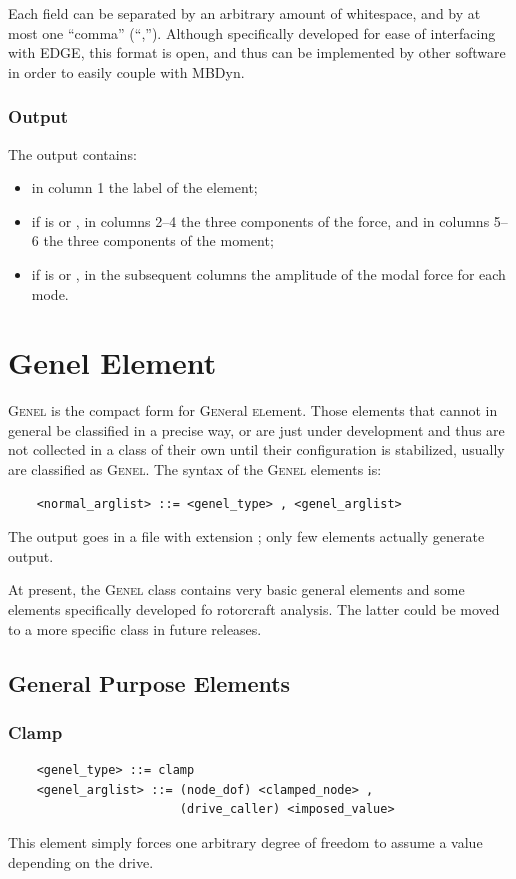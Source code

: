 Each field can be separated by an arbitrary amount of whitespace,
and by at most one ``comma'' (``,'').
Although specifically developed for ease of interfacing with EDGE,
this format is open, and thus can be implemented by other software
in order to easily couple with MBDyn.


\subsubsection{Output}
The output contains:
\begin{itemize}
\item in column 1 the label of the element;
\item if  is  or ,
	in columns 2--4 the three components of the force,
	and in columns 5--6 the three components of the moment;
\item if  is  or ,
	in the subsequent columns the amplitude of the modal force
	for each mode.
\end{itemize}



\section{Genel Element}
\label{sec:EL:GENEL}
\textsc{Genel} is the compact form for \textsc{Gen}eral \textsc{el}ement.
Those elements that cannot in general be classified in a precise way, 
or are just under development and thus are not collected in a class 
of their own until their configuration is stabilized, usually are
classified as \textsc{Genel}.
The syntax of the \textsc{Genel} elements is:
\begin{verbatim}
    <normal_arglist> ::= <genel_type> , <genel_arglist>
\end{verbatim}

\noindent
The output goes in a file with extension ; only few elements
actually generate output.

\noindent
At present, the \textsc{Genel} class contains very basic general elements
and some elements specifically developed fo rotorcraft analysis.
The latter could be moved to a more specific class in future releases.

\subsection{General Purpose Elements}
   
\subsubsection{Clamp}
\begin{verbatim}
    <genel_type> ::= clamp
    <genel_arglist> ::= (node_dof) <clamped_node> ,
                        (drive_caller) <imposed_value>
\end{verbatim}
This element simply forces one arbitrary degree of freedom to assume a value
depending on the drive.

